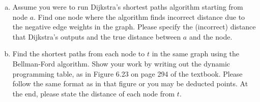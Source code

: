 \documentclass[10pt]{article}
\begin{document}
\begin{enumerate}[a.]
\item Assume you were to run Dijkstra's shortest paths algorithm starting from node $a$. Find one node where the algorithm finds incorrect distance due to the negative edge weights in the graph. Please specify the (incorrect) distance that Dijkstra's outputs and the true distance between $a$ and the node.

\begin{center}
\end{center}

\item Find the shortest paths from each node to $t$ in the same graph using the Bellman-Ford algorithm. Show your work by writing out the dynamic programming table, as in Figure 6.23 on page 294 of the textbook. Please follow the same format as in that figure or you may be deducted points. At the end, please state the distance of each node from $t$.
\end{enumerate}
\end{document}
